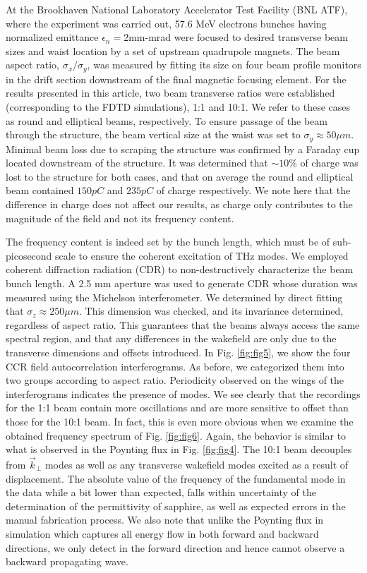 \documentclass{article}
\begin{document}
At the Brookhaven National Laboratory Accelerator Test Facility (BNL ATF), where the experiment was carried out, 57.6 MeV electrons bunches having normalized emittance $\epsilon_n=$2mm-mrad were focused to desired transverse beam sizes and waist location by a set of upstream quadrupole magnets. The beam aspect ratio, $\sigma_x/\sigma_y$, was measured by fitting its size on four beam profile monitors in the drift section downstream of the final magnetic focusing element. For the results presented in this article, two beam transverse ratios were established (corresponding to the FDTD simulations), 1:1 and 10:1. We refer to these cases as round and elliptical beams, respectively. To ensure passage of the beam through the structure, the beam vertical size at the waist was set to $\sigma_y \approx 50 \mu m$. Minimal beam loss due to scraping the structure was confirmed by a Faraday cup located downstream of the structure. It was determined that $\sim 10\%$ of charge was lost to the structure for both cases, and that on average the round and elliptical beam contained $150 pC$ and $235 pC$ of charge respectively. We note here that the difference in charge does not affect our results, as charge only contributes to the magnitude of the field and not its frequency content.

The frequency content is indeed set by the bunch length, which must be of sub-picosecond scale to ensure the coherent excitation of THz modes. We employed coherent diffraction radiation (CDR) \cite{Shibata1994} to non-destructively characterize the beam bunch length. A 2.5 mm aperture was used to generate CDR whose duration was measured using the Michelson interferometer. We determined by direct fitting \cite{Murokh1998452} that $\sigma_z \approx 250 \mu m$. This dimension was checked, and its invariance determined, regardless of aspect ratio. This guarantees that the beams always access the same spectral region, and that any differences in the wakefield are only due to the transverse dimensions and offsets introduced. In Fig. \ref{fig:fig5}, we show the four CCR field autocorrelation interferograms. As before, we categorized them into two groups according to aspect ratio. Periodicity observed on the wings of the interferograms indicates the presence of modes. We see clearly that the recordings for the 1:1 beam contain more oscillations and are more sensitive to offset than those for the 10:1 beam. In fact, this is even more obvious when we examine the obtained frequency spectrum of Fig. \ref{fig:fig6}. Again, the behavior is similar to what is observed in the Poynting flux in Fig. \ref{fig:fig4}. The 10:1 beam decouples from $\vec{k}_\perp$ modes as well as any transverse wakefield modes excited as a result of displacement. The absolute value of the frequency of the fundamental mode in the data while a bit lower than expected, falls within uncertainty of the determination of the permittivity of sapphire, as well as expected errors in the manual fabrication process. We also note that unlike the Poynting flux in simulation which captures all energy flow in both forward and backward directions, we only detect in the forward direction and hence cannot observe a backward propagating wave.
\end{document}
